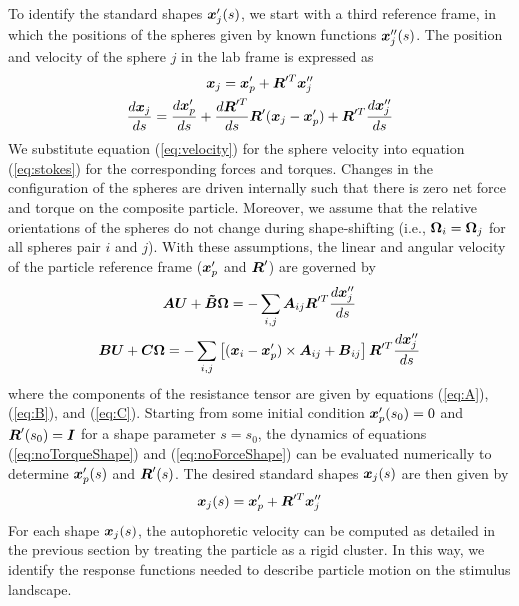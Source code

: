 \begin{appendices}
To identify the standard shapes $\boldsymbol{x}'_j(s)$,  we start with a third reference frame, in which the positions of the spheres given by known functions $\boldsymbol{x}''_j(s)$.  The position and velocity of the sphere $j$ in the lab frame is expressed as 
\begin{gather}
    \boldsymbol{x}_j = \boldsymbol{x}'_p + \boldsymbol{R}'^T \boldsymbol{x}''_j 
    \\
    \frac{d\boldsymbol{x}_j}{ds} = \frac{d \boldsymbol{x}'_p}{ds} + \frac{d\boldsymbol{R}'^T}{d s} \boldsymbol{R}'(\boldsymbol{x}_j-\boldsymbol{x}'_p) + \boldsymbol{R}'^T\frac{d \boldsymbol{x}''_j}{ds} \label{eq:velocity}
\end{gather}
We substitute equation (\ref{eq:velocity}) for the sphere velocity into equation (\ref{eq:stokes}) for the corresponding forces and torques.  Changes in the configuration of the spheres are driven internally such that there is zero net force and torque on the composite particle.  Moreover, we assume that the relative orientations of the spheres do not change during shape-shifting (i.e., $\boldsymbol{\Omega}_i=\boldsymbol{\Omega}_j$ for all spheres pair $i$ and $j$). With these assumptions, the linear and angular velocity of the particle reference frame ($\boldsymbol{x}_p'$ and $\boldsymbol{R}'$) are governed by
\begin{gather}
    \boldsymbol{A}\boldsymbol{U} + \boldsymbol{\tilde{B}} \boldsymbol{\Omega} = -\sum_{i,j} \boldsymbol{A}_{ij} \boldsymbol{R}'^T \frac{d \boldsymbol{x}_j''}{d s} \label{eq:noForceShape}
    \\
    \boldsymbol{B}\boldsymbol{U} + \boldsymbol{C} \boldsymbol{\Omega} = -\sum_{i,j}\left[(\boldsymbol{x}_i-\boldsymbol{x}_p') \times \boldsymbol{A}_{ij} + \boldsymbol{B}_{ij}\right] \boldsymbol{R}'^T \frac{d \boldsymbol{x}_j''}{d s} \label{eq:noTorqueShape}
\end{gather}
where the components of the resistance tensor are given by equations (\ref{eq:A}), (\ref{eq:B}), and (\ref{eq:C}).
Starting from some initial condition $\boldsymbol{x}'_p(s_0)=0$ and $\boldsymbol{R}'(s_0) = \boldsymbol{I}$ for a shape parameter $s=s_0$, the dynamics of equations (\ref{eq:noTorqueShape}) and (\ref{eq:noForceShape}) can be evaluated numerically to determine $\boldsymbol{x}'_p(s)$ and $\boldsymbol{R}'(s)$.  The desired standard shapes $\boldsymbol{x}_j(s)$ are then given by
\begin{equation}
    \boldsymbol{x}_j(s) = \boldsymbol{x}_p' + \boldsymbol{R}'^T\boldsymbol{x}_j''
\end{equation}
For each shape $\boldsymbol{x}_j(s)$, the autophoretic velocity can be computed as detailed in the previous section by treating the particle as a rigid cluster.  In this way, we identify the response functions needed to describe particle motion on the stimulus landscape.

\clearpage

\end{appendices}
